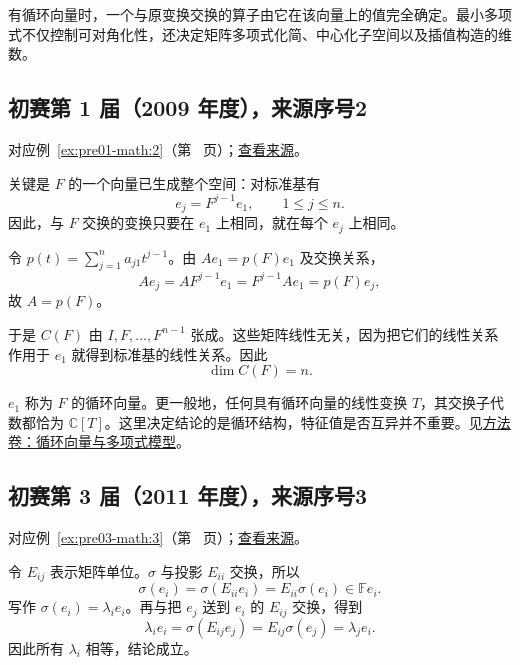 \documentclass[12pt,fontset=fandol]{ctexart}
\begin{document}
\label{sec:solutions-5}

有循环向量时，一个与原变换交换的算子由它在该向量上的值完全确定。最小多项式不仅控制可对角化性，还决定矩阵多项式化简、中心化子空间以及插值构造的维数。

\subsection{初赛第 1 届（2009 年度），来源序号2}\label{ans:pre01-math:2}\label{pr:pre01-math:2}

对应例~\ref{ex:pre01-math:2}（第~\pageref{ex:pre01-math:2} 页）；\href{https://github.com/lzxcr/cmc-mathematics/blob/64916fa1fdbc3e444a652eca204d5669058ee321/src/problems/preliminary/01/02.md}{查看来源}。

\begin{solve}

关键是 $F$ 的一个向量已生成整个空间：对标准基有
\[
e_j=F^{j-1}e_1,\qquad 1\le j\le n.
\]
因此，与 $F$ 交换的变换只要在 $e_1$ 上相同，就在每个 $e_j$ 上相同。

令 $p(t)=\sum_{j=1}^n a_{j1}t^{j-1}$。由 $Ae_1=p(F)e_1$ 及交换关系，
\[
Ae_j=AF^{j-1}e_1=F^{j-1}Ae_1=p(F)e_j,
\]
故 $A=p(F)$。

于是 $C(F)$ 由 $I,F,\ldots,F^{n-1}$ 张成。这些矩阵线性无关，因为把它们的线性关系作用于 $e_1$ 就得到标准基的线性关系。因此
\[
\boxed{\dim C(F)=n.}
\]

\end{solve}

\begin{remark}[方法与条件]

$e_1$ 称为 $F$ 的循环向量。更一般地，任何具有循环向量的线性变换 $T$，其交换子代数都恰为 $\mathbb C[T]$。这里决定结论的是循环结构，特征值是否互异并不重要。见\hyperref[app:linear-cyclic]{方法卷：循环向量与多项式模型}。

\end{remark}

\subsection{初赛第 3 届（2011 年度），来源序号3}\label{ans:pre03-math:3}\label{pr:pre03-math:3}

对应例~\ref{ex:pre03-math:3}（第~\pageref{ex:pre03-math:3} 页）；\href{https://github.com/lzxcr/cmc-mathematics/blob/64916fa1fdbc3e444a652eca204d5669058ee321/src/problems/preliminary/03/03.md}{查看来源}。

\begin{solve}

令 $E_{ij}$ 表示矩阵单位。$\sigma$ 与投影 $E_{ii}$ 交换，所以
\[
\sigma(e_i)=\sigma(E_{ii}e_i)=E_{ii}\sigma(e_i)\in\mathbb F e_i.
\]
写作 $\sigma(e_i)=\lambda_i e_i$。再与把 $e_j$ 送到 $e_i$ 的 $E_{ij}$ 交换，得到
\[
\lambda_i e_i
=\sigma(E_{ij}e_j)
=E_{ij}\sigma(e_j)
=\lambda_j e_i.
\]
因此所有 $\lambda_i$ 相等，结论成立。

\end{solve}
\end{document}
